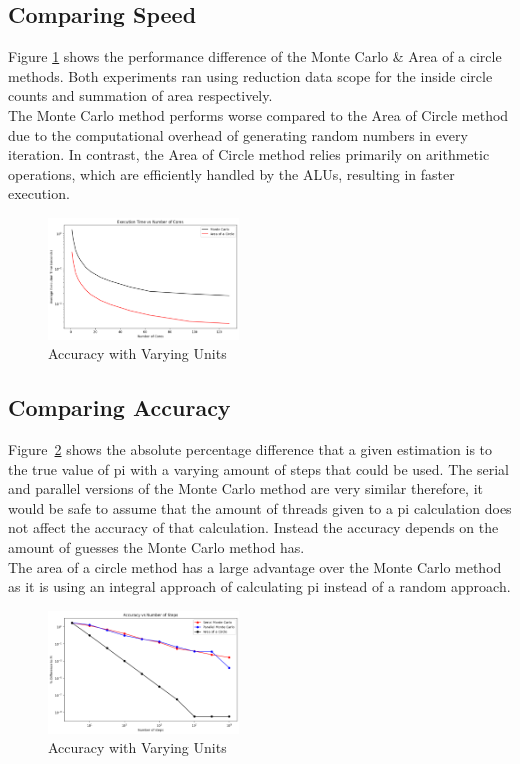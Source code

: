 \documentclass[conference]{IEEEtran}
\begin{document}
\subsection{Comparing Speed}
Figure \ref{fig:comparingspeed} shows the performance difference of the Monte Carlo \& Area of a circle methods. Both experiments ran using reduction data scope for the inside circle counts and summation of area respectively.\\
The Monte Carlo method performs worse compared to the Area of Circle method due to the computational overhead of generating random numbers in every iteration. In contrast, the Area of Circle method relies primarily on arithmetic operations, which are efficiently handled by the ALUs, resulting in faster execution.\begin{figure}[H]

    \centering
    \includegraphics[width=0.45\textwidth]{../img/aoc_vs_mc.png}
    \caption{Accuracy with Varying Units}
    \label{fig:comparingspeed}
\end{figure}

\subsection{Comparing Accuracy}
Figure~\ref{fig:accuracy} shows the absolute percentage difference that a given estimation is to the true value of pi with a varying amount of steps that could be used.
The serial and parallel versions of the Monte Carlo method are very similar therefore, it would be safe to assume that the amount of threads given to a pi calculation does not affect the accuracy of that calculation. 
Instead the accuracy depends on the amount of guesses the Monte Carlo method has.  \\
The area of a circle method has a large advantage over the Monte Carlo method as it is using an integral approach of calculating pi instead of a random approach.

\begin{figure}[H]
    \centering
    \includegraphics[width=0.45\textwidth]{../img/accuracy.png}
    \caption{Accuracy with Varying Units}
    \label{fig:accuracy}
\end{figure}
\end{document}

